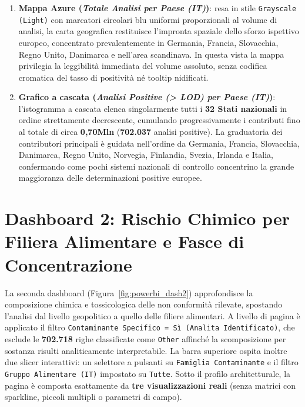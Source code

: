 \begin{enumerate}
    \item \textbf{Mappa Azure (\textit{Totale Analisi per Paese (IT)})}: resa in stile \texttt{Grayscale (Light)} con marcatori circolari blu uniformi proporzionali al volume di analisi, la carta geografica restituisce l'impronta spaziale dello sforzo ispettivo europeo, concentrato prevalentemente in Germania, Francia, Slovacchia, Regno Unito, Danimarca e nell'area scandinava. In questa vista la mappa privilegia la leggibilità immediata del volume assoluto, senza codifica cromatica del tasso di positività né tooltip nidificati.

    \item \textbf{Grafico a cascata (\textit{Analisi Positive (\textgreater{} LOD) per Paese (IT)})}: l'istogramma a cascata elenca singolarmente tutti i \textbf{32 Stati nazionali} in ordine strettamente decrescente, cumulando progressivamente i contributi fino al totale di circa \textbf{0,70Mln} (\textbf{702.037} analisi positive). La graduatoria dei contributori principali è guidata nell'ordine da Germania, Francia, Slovacchia, Danimarca, Regno Unito, Norvegia, Finlandia, Svezia, Irlanda e Italia, confermando come pochi sistemi nazionali di controllo concentrino la grande maggioranza delle determinazioni positive europee.
\end{enumerate}

\section{Dashboard 2: Rischio Chimico per Filiera Alimentare e Fasce di Concentrazione}
\label{sec:powerbi_dash2}

La seconda dashboard (Figura~\ref{fig:powerbi_dash2}) approfondisce la composizione chimica e tossicologica delle non conformità rilevate, spostando l'analisi dal livello geopolitico a quello delle filiere alimentari. A livello di pagina è applicato il filtro \texttt{Contaminante Specifico = Sì (Analita Identificato)}, che esclude le \textbf{702.718} righe classificate come \texttt{Other} affinché la scomposizione per sostanza risulti analiticamente interpretabile. La barra superiore ospita inoltre due slicer interattivi: un selettore a pulsanti su \texttt{Famiglia Contaminante} e il filtro \texttt{Gruppo Alimentare (IT)} impostato su \texttt{Tutte}. Sotto il profilo architetturale, la pagina è composta esattamente da \textbf{tre visualizzazioni reali} (senza matrici con sparkline, piccoli multipli o parametri di campo).


